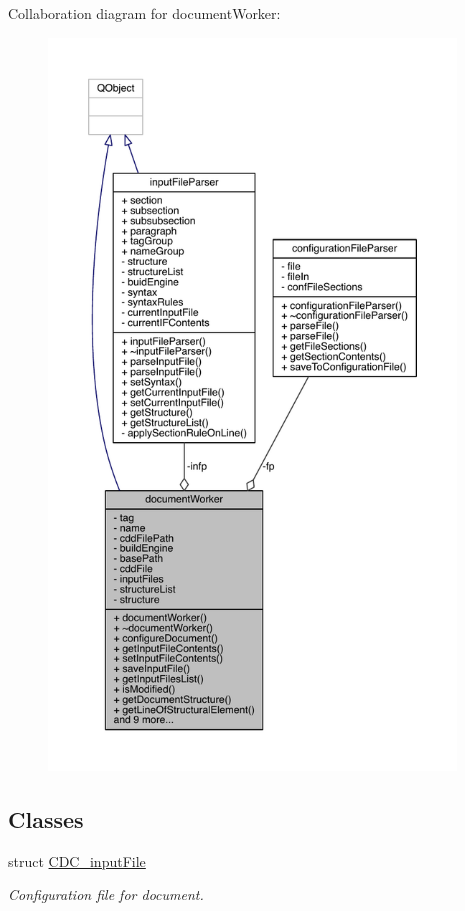 Collaboration diagram for document\+Worker\+:\nopagebreak
\begin{figure}[H]
\begin{center}
\leavevmode
\includegraphics[height=550pt]{classdocument_worker__coll__graph}
\end{center}
\end{figure}
\subsection*{Classes}
\begin{DoxyCompactItemize}
\item 
struct \hyperlink{structdocument_worker_1_1_c_d_c__input_file}{C\+D\+C\+\_\+input\+File}
\begin{DoxyCompactList}\small\item\em Configuration file for document. \end{DoxyCompactList}\end{DoxyCompactItemize}
